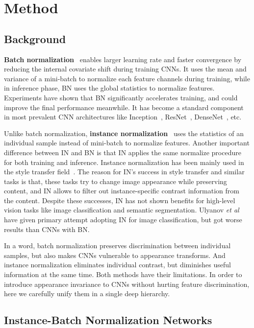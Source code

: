 \documentclass[runningheads]{llncs}
\begin{document}
\section{Method}

\subsection{Background}
\textbf{Batch normalization}~\cite{ioffe2015batch} enables larger learning rate and faster convergence by reducing the internal covariate shift during training CNNs.
It uses the mean and variance of a mini-batch to normalize each feature channels during training,
while in inference phase, BN uses the global statistics to normalize features.
Experiments have shown that BN significantly accelerates training, and could improve the final performance meanwhile.
It has become a standard component in most prevalent CNN architectures like Inception~\cite{szegedy2015going}, ResNet~\cite{he2016deep}, DenseNet~\cite{huang2017densely}, etc.

Unlike batch normalization, \textbf{instance normalization}~\cite{ulyanov2017improved} uses the statistics of an individual sample instead of mini-batch to normalize features.
Another important difference between IN and BN is that IN applies the same normalize procedure for both training and inference.
Instance normalization has been mainly used in the style transfer field~\cite{ulyanov2017improved,dumoulin2016learned,huang2017arbitrary}.
The reason for IN's success in style transfer and similar tasks is that, these tasks try to change image appearance while preserving content, and IN allows to filter out instance-specific contrast information from the content.
Despite these successes, IN has not shown benefits for high-level vision tasks like image classification and semantic segmentation.
Ulyanov \textit{et al}~\cite{ulyanov2017improved} have given primary attempt adopting IN for image classification, but got worse results than CNNs with BN.

In a word, batch normalization preserves discrimination between individual samples, but also makes CNNs vulnerable to appearance transforms.
And instance normalization eliminates individual contrast, but diminishes useful information at the same time. 
Both methods have their limitations.
In order to introduce appearance invariance to CNNs without hurting feature discrimination, here we carefully unify them in a single deep hierarchy. 


\subsection{Instance-Batch Normalization Networks}
\end{document}
